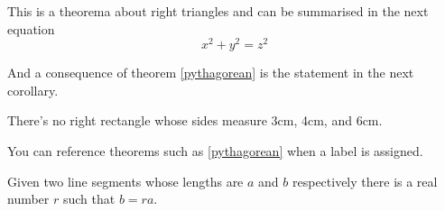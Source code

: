 \begin{theorem}
\label{pythagorean}
This is a theorema about right triangles and can be summarised in the next 
equation 
\[ x^2 + y^2 = z^2 \]
\end{theorem}

And a consequence of theorem \ref{pythagorean} is the statement in the next 
corollary.

\begin{corollary}
There's no right rectangle whose sides measure 3cm, 4cm, and 6cm.
\end{corollary}

You can reference theorems such as \ref{pythagorean} when a label is assigned.

\begin{lemma}
Given two line segments whose lengths are $a$ and $b$ respectively there is a 
real number $r$ such that $b=ra$.
\end{lemma}

\section{}




\section{}

\section{}



\section{}


\section{}







\section{}




\section{}








\section{}